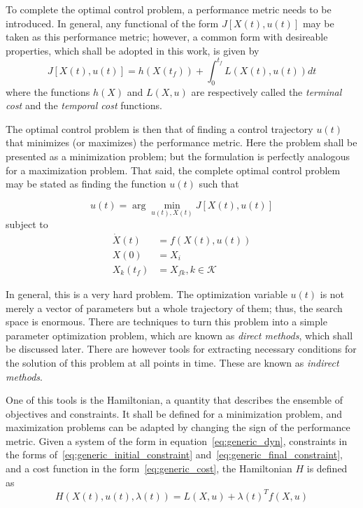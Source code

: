 To complete the optimal control problem, a performance metric needs to be introduced. In general, any functional of the form \(J[X(t), u(t)]\) may be taken as this performance metric; however, a common form with desireable properties, which shall be adopted in this work, is given by
\begin{equation} \label{eq:generic_cost}
    J[X(t), u(t)] = h(X(t_f)) + \int_0^{t_f} L(X(t), u(t)) dt
\end{equation}
where the functions \(h(X)\) and \(L(X, u)\) are respectively called the \textit{terminal cost} and the \textit{temporal cost} functions.\

The optimal control problem is then that of finding a control trajectory \(u(t)\) that minimizes (or maximizes) the performance metric. Here the problem shall be presented as a minimization problem; but the formulation is perfectly analogous for a maximization problem. That said, the complete optimal control problem may be stated as finding the function \(u(t)\) such that

\begin{equation} \label{eq:argmin_cost}
    u(t) = \arg \min_{u(t), X(t)} J[X(t), u(t)]
\end{equation}
subject to
\begin{align}
    \dot X(t) &= f(X(t), u(t)) \\
    X(0) &= X_i \\
    X_k(t_f) &= X_{fk}, k\in \mathcal{K}
\end{align}

In general, this is a very hard problem. The optimization variable \(u(t)\) is not merely a vector of parameters but a whole trajectory of them; thus, the search space is enormous. There are techniques to turn this problem into a simple parameter optimization problem, which are known as \textit{direct methods}, which shall be discussed later. There are however tools for extracting necessary conditions for the solution of this problem at all points in time. These are known as \textit{indirect methods}.

One of this tools is the Hamiltonian, a quantity that describes the ensemble of objectives and constraints. It shall be defined for a minimization problem, and maximization problems can be adapted by changing the sign of the performance metric. Given a system of the form in equation~\eqref{eq:generic_dyn}, constraints in the forms of~\eqref{eq:generic_initial_constraint} and~\eqref{eq:generic_final_constraint}, and a cost function in the form~\eqref{eq:generic_cost}, the Hamiltonian \(H\) is defined as
\begin{equation}
    H(X(t), u(t), \lambda(t)) = L(X, u) + \lambda{(t)}^T f(X, u)
\end{equation}


